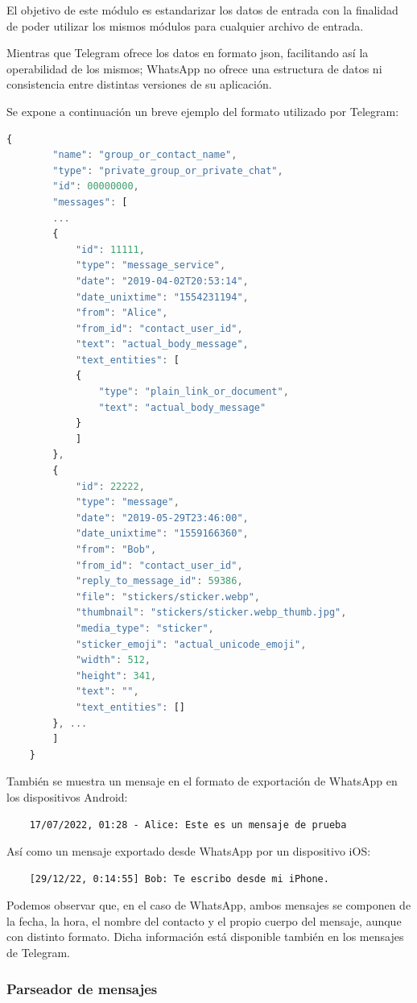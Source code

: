 El objetivo de este módulo es estandarizar los datos de entrada con la finalidad de poder utilizar los mismos módulos para cualquier archivo de entrada.

Mientras que Telegram ofrece los datos en formato \acrshort{json}, facilitando así la operabilidad de los mismos; WhatsApp no ofrece una estructura de datos ni consistencia entre distintas versiones de su aplicación.

Se expone a continuación un breve ejemplo del formato utilizado por Telegram:

\begin{lstlisting}[language=JavaScript]
	{
		"name": "group_or_contact_name",
		"type": "private_group_or_private_chat",
		"id": 00000000,
		"messages": [
		...
		{
			"id": 11111,
			"type": "message_service",
			"date": "2019-04-02T20:53:14",
			"date_unixtime": "1554231194",
			"from": "Alice",
			"from_id": "contact_user_id",
			"text": "actual_body_message",
			"text_entities": [
			{
				"type": "plain_link_or_document",
				"text": "actual_body_message"
			}
			]
		},
		{
			"id": 22222,
			"type": "message",
			"date": "2019-05-29T23:46:00",
			"date_unixtime": "1559166360",
			"from": "Bob",
			"from_id": "contact_user_id",
			"reply_to_message_id": 59386,
			"file": "stickers/sticker.webp",
			"thumbnail": "stickers/sticker.webp_thumb.jpg",
			"media_type": "sticker",
			"sticker_emoji": "actual_unicode_emoji",
			"width": 512,
			"height": 341,
			"text": "",
			"text_entities": []
		}, ...
		]
	}
\end{lstlisting}

También se muestra un mensaje en el formato de exportación de WhatsApp en los dispositivos Android:

\begin{lstlisting}
	17/07/2022, 01:28 - Alice: Este es un mensaje de prueba
\end{lstlisting}

Así como un mensaje exportado desde WhatsApp por un dispositivo iOS:

\begin{lstlisting}
	[29/12/22, 0:14:55] Bob: Te escribo desde mi iPhone.
\end{lstlisting}

Podemos observar que, en el caso de WhatsApp, ambos mensajes se componen de la fecha, la hora, el nombre del contacto y el propio cuerpo del mensaje, aunque con distinto formato. Dicha información está disponible también en los mensajes de Telegram.

\subsubsection{Parseador de mensajes}

